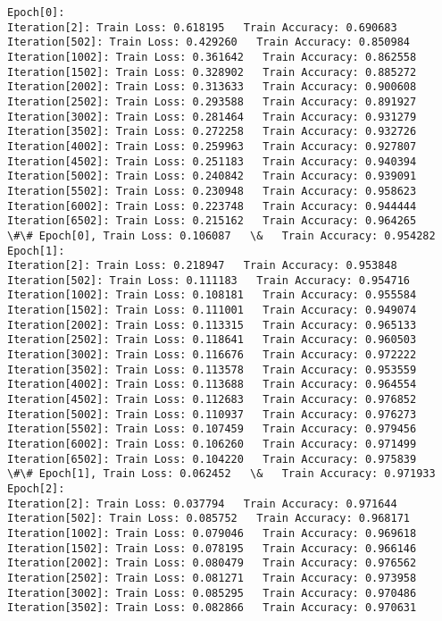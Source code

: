 \documentclass[11pt]{article}
\begin{document}
    \begin{Verbatim}[commandchars=\\\{\}]
Epoch[0]:
Iteration[2]: Train Loss: 0.618195   Train Accuracy: 0.690683 
Iteration[502]: Train Loss: 0.429260   Train Accuracy: 0.850984 
Iteration[1002]: Train Loss: 0.361642   Train Accuracy: 0.862558 
Iteration[1502]: Train Loss: 0.328902   Train Accuracy: 0.885272 
Iteration[2002]: Train Loss: 0.313633   Train Accuracy: 0.900608 
Iteration[2502]: Train Loss: 0.293588   Train Accuracy: 0.891927 
Iteration[3002]: Train Loss: 0.281464   Train Accuracy: 0.931279 
Iteration[3502]: Train Loss: 0.272258   Train Accuracy: 0.932726 
Iteration[4002]: Train Loss: 0.259963   Train Accuracy: 0.927807 
Iteration[4502]: Train Loss: 0.251183   Train Accuracy: 0.940394 
Iteration[5002]: Train Loss: 0.240842   Train Accuracy: 0.939091 
Iteration[5502]: Train Loss: 0.230948   Train Accuracy: 0.958623 
Iteration[6002]: Train Loss: 0.223748   Train Accuracy: 0.944444 
Iteration[6502]: Train Loss: 0.215162   Train Accuracy: 0.964265 
\#\# Epoch[0], Train Loss: 0.106087   \&   Train Accuracy: 0.954282
Epoch[1]:
Iteration[2]: Train Loss: 0.218947   Train Accuracy: 0.953848 
Iteration[502]: Train Loss: 0.111183   Train Accuracy: 0.954716 
Iteration[1002]: Train Loss: 0.108181   Train Accuracy: 0.955584 
Iteration[1502]: Train Loss: 0.111001   Train Accuracy: 0.949074 
Iteration[2002]: Train Loss: 0.113315   Train Accuracy: 0.965133 
Iteration[2502]: Train Loss: 0.118641   Train Accuracy: 0.960503 
Iteration[3002]: Train Loss: 0.116676   Train Accuracy: 0.972222 
Iteration[3502]: Train Loss: 0.113578   Train Accuracy: 0.953559 
Iteration[4002]: Train Loss: 0.113688   Train Accuracy: 0.964554 
Iteration[4502]: Train Loss: 0.112683   Train Accuracy: 0.976852 
Iteration[5002]: Train Loss: 0.110937   Train Accuracy: 0.976273 
Iteration[5502]: Train Loss: 0.107459   Train Accuracy: 0.979456 
Iteration[6002]: Train Loss: 0.106260   Train Accuracy: 0.971499 
Iteration[6502]: Train Loss: 0.104220   Train Accuracy: 0.975839 
\#\# Epoch[1], Train Loss: 0.062452   \&   Train Accuracy: 0.971933
Epoch[2]:
Iteration[2]: Train Loss: 0.037794   Train Accuracy: 0.971644 
Iteration[502]: Train Loss: 0.085752   Train Accuracy: 0.968171 
Iteration[1002]: Train Loss: 0.079046   Train Accuracy: 0.969618 
Iteration[1502]: Train Loss: 0.078195   Train Accuracy: 0.966146 
Iteration[2002]: Train Loss: 0.080479   Train Accuracy: 0.976562 
Iteration[2502]: Train Loss: 0.081271   Train Accuracy: 0.973958 
Iteration[3002]: Train Loss: 0.085295   Train Accuracy: 0.970486 
Iteration[3502]: Train Loss: 0.082866   Train Accuracy: 0.970631 

\end{Verbatim}
\end{document}
